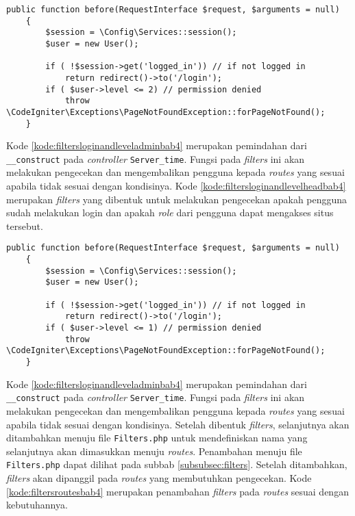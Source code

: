 \begin{lstlisting}[caption=Pemindahan kode pada \textit{Filters}, label=kode:filtersloginandleveladminbab4]
	public function before(RequestInterface $request, $arguments = null)
    {   
        $session = \Config\Services::session();
        $user = new User();

		if ( !$session->get('logged_in')) // if not logged in
			return redirect()->to('/login');
        if ( $user->level <= 2) // permission denied
			throw \CodeIgniter\Exceptions\PageNotFoundException::forPageNotFound();	
    }
\end{lstlisting}

Kode \ref{kode:filtersloginandleveladminbab4} merupakan pemindahan dari \texttt{\_\_construct} pada \textit{controller}  \texttt{Server\_time}. Fungsi pada \textit{filters} ini akan melakukan pengecekan dan mengembalikan pengguna kepada \textit{routes} yang sesuai apabila tidak sesuai dengan kondisinya. Kode \ref{kode:filtersloginandlevelheadbab4} merupakan \textit{filters} yang dibentuk untuk melakukan pengecekan apakah pengguna sudah melakukan login dan apakah \textit{role} dari pengguna dapat mengakses situs tersebut.

\begin{lstlisting}[caption=Pemindahan kode pada \textit{Filters}, label=kode:filtersloginandlevelheadbab4]
	public function before(RequestInterface $request, $arguments = null)
    {   
        $session = \Config\Services::session();
        $user = new User();

		if ( !$session->get('logged_in')) // if not logged in
			return redirect()->to('/login');
        if ( $user->level <= 1) // permission denied
			throw \CodeIgniter\Exceptions\PageNotFoundException::forPageNotFound();	
    }
\end{lstlisting}

Kode \ref{kode:filtersloginandleveladminbab4} merupakan pemindahan dari \texttt{\_\_construct} pada \textit{controller}  \texttt{Server\_time}. Fungsi pada \textit{filters} ini akan melakukan pengecekan dan mengembalikan pengguna kepada \textit{routes} yang sesuai apabila tidak sesuai dengan kondisinya. Setelah dibentuk \textit{filters}, selanjutnya akan ditambahkan menuju file \texttt{Filters.php} untuk mendefiniskan nama yang selanjutnya akan dimasukkan menuju \textit{routes}. Penambahan menuju file \texttt{Filters.php} dapat dilihat pada subbab \ref{subsubsec:filters}. Setelah ditambahkan, \textit{filters} akan dipanggil pada \textit{routes} yang membutuhkan pengecekan. Kode \ref{kode:filtersroutesbab4} merupakan penambahan \textit{filters} pada \textit{routes} sesuai dengan kebutuhannya.

